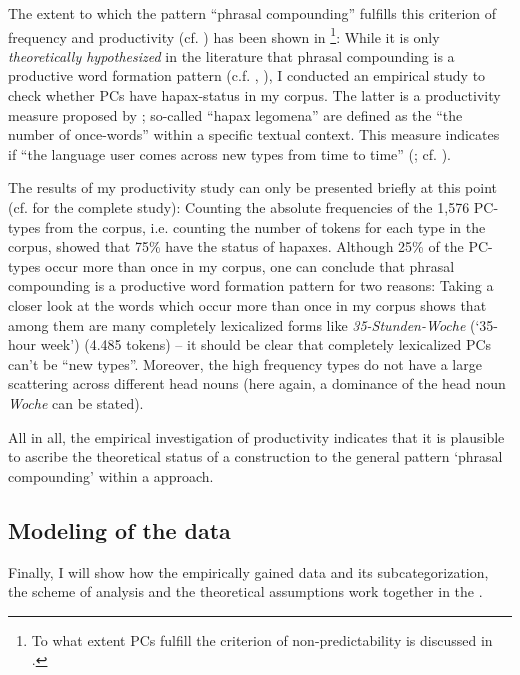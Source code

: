 \documentclass[output=paper]{LSP/langsci}
\begin{document}
The extent to which the pattern ``phrasal compounding'' fulfills this criterion of frequency and productivity (cf. \citealt[51f]{Booij2010}) has been shown in \citet{Hein2015}\footnote{To what extent PCs fulfill the criterion of non-predictability is discussed in \citet[Chapter~II.2.2.3]{Hein2015}.}: While it is only \textit{theoretically hypothesized} in the literature that phrasal compounding is a productive word formation pattern (c.f. \citealt{Lieber1992}, \citealt{Meibauer2003}), I conducted an empirical study to check whether PCs have hapax-status in my corpus. The latter is a productivity measure proposed by \citet{Baayen1992}; so-called ``hapax legomena'' are defined as the ``the number of once-words'' \citep[28]{Tuldava2005} within a specific textual context. This measure indicates if ``the language user comes across new types from time to time” (\citealt[52]{Booij2010}; cf.  \citealt[106]{ZiemLasch2013}). 

The results of my productivity study can only be presented briefly at this point (cf. \citealt[Chapter III.3.2]{Hein2015} for the complete study): Counting the absolute frequencies of the 1,576 PC-types from the corpus, i.e. counting the number of tokens for each type in the corpus, showed that 75\% have the status of hapaxes. Although 25\% of the PC-types occur more than once in my corpus, one can conclude that phrasal compounding is a productive word formation pattern for two reasons: Taking a closer look at the words which occur more than once in my corpus shows that among them are many completely lexicalized forms like \textit{35-Stunden-Woche} (‘35-hour week’) (4.485 tokens) -- it should be clear that completely lexicalized PCs can’t be ``new types''. Moreover, the high frequency types do not have a large scattering across different head nouns (here again, a dominance of the head noun \textit{Woche} can be stated).

All in all, the empirical investigation of productivity indicates that it is plausible to ascribe the theoretical status of a construction to the general pattern ‘phrasal compounding’ within a   approach. 


\subsection{Modeling of the data}\label{sec:hein:2.4}
Finally, I will show how the empirically gained data and its subcategorization, the scheme of analysis and the theoretical assumptions work together in the .
\end{document}
